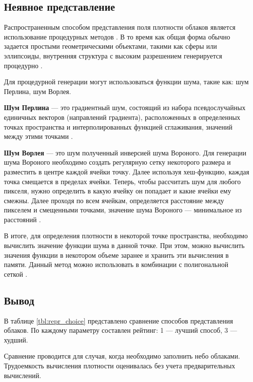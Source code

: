 \subsection{Неявное представление} 
\label{implicit}
Распространенным способом представления поля плотности облаков является использование процедурных методов \cite{frostbite, hzd}. В то время как общая форма обычно задается простыми геометрическими объектами, такими как сферы или эллипсоиды, внутренняя структура с высоким разрешением генерируется процедурно \cite{clouds}. 

Для процедурной генерации могут использоваться функции шума, такие как: шум Перлина, шум Ворлея. 

\textbf{Шум Перлина} --- это градиентный шум, состоящий из набора псевдослучайных единичных векторов (направлений градиента), расположенных в определенных точках пространства и интерполированных функцией сглаживания, значений между этими точками \cite{perlin}.

\textbf{Шум Ворлея} --- это шум полученный инверсией шума Вороного. Для генерации шума Вороного необходимо создать регулярную сетку некоторого размера и разместить в центре каждой ячейки точку. Далее используя хеш-функцию, каждая точка смещается в пределах ячейки. Теперь, чтобы рассчитать шум для любого пикселя, нужно определить в какую ячейку он попадает и какие ячейки ему смежны. Далее проходя по всем ячейкам, определяется расстояние между пикселем и смещенными точками, значение шума Вороного --- минимальное из расстояний \cite{worley}. 

В итоге, для определения плотности в некоторой точке пространства, необходимо вычислить значение функции шума в данной точке. При этом, можно вычислить значения функции в некотором объеме заранее и хранить эти вычисления в памяти. Данный метод можно использовать в комбинации с полигональной сеткой \cite{implicit, hzd, frostbite, clouds}.


\subsection*{Вывод}

В таблице \ref{tbl:repr_choice} представлено сравнение способов представления облаков. По каждому параметру составлен рейтинг: 1 --- лучший способ, 3 --- худший.

Сравнение проводится для случая, когда необходимо заполнить небо облаками. Трудоемкость вычисления плотности оценивалась без учета предварительных вычислений.

